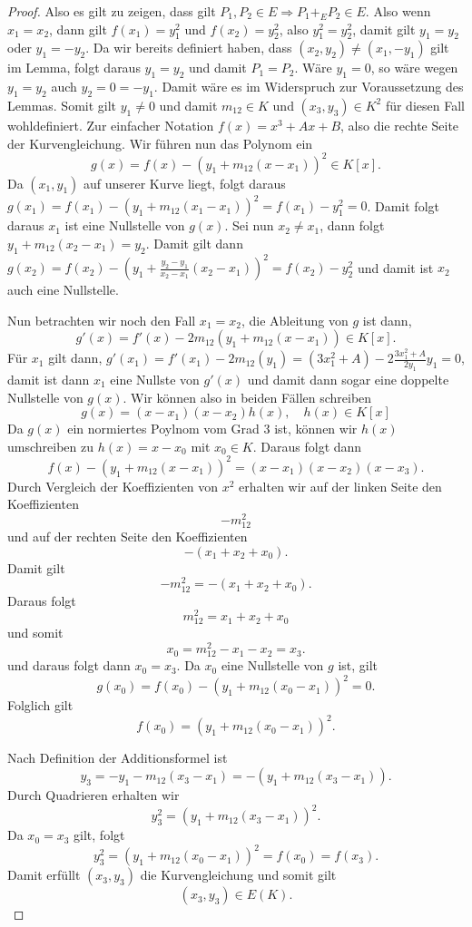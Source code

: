 \begin{proof}
    Also es gilt zu zeigen, dass gilt $P_1,P_2\in E \Rightarrow P_1 +_E P_2 \in E$. Also wenn $x_1=x_2$, dann gilt \(f(x_1)=y_1^2 \) und \(f(x_2)=y_2^2\), also $y_1^2=y_2^2$, damit gilt \(y_1= y_2 \) oder \(y_1=-y_2\). Da wir bereits definiert haben, dass $(x_2,y_2)\neq (x_1,-y_1)$ gilt im Lemma, folgt daraus $y_1=y_2$ und damit $P_1=P_2$. Wäre $y_1=0$, so wäre wegen $y_1=y_2$ auch $y_2=0=-y_1$. Damit wäre es im Widerspruch zur Voraussetzung des Lemmas. Somit gilt $y_1\neq 0$ und damit $m_{12}\in K$ und $(x_3,y_3)\in K^2$ für diesen Fall wohldefiniert.
    Zur einfacher Notation $f(x)=x^3+Ax+B$, also die rechte Seite der Kurvengleichung. Wir führen nun das Polynom ein
    \[
        g(x)=f(x)-(y_1+m_{12}(x-x_1))^2\in K[x].
    \]
    Da $(x_1,y_1)$ auf unserer Kurve liegt, folgt daraus $g(x_1)=f(x_1)-(y_1+m_{12}(x_1-x_1))^2=f(x_1)-y_1^2=0$. Damit folgt daraus $x_1$ ist eine Nullstelle von $g(x)$.
    Sei nun $x_2\neq x_1$, dann folgt $y_1+m_{12}(x_2-x_1)=y_2$. Damit gilt dann $g(x_2)=f(x_2)-(y_1+\frac{y_2-y_1}{x_2-x_1}(x_2-x_1))^2 =f(x_2)-y_2^2$ und damit ist $x_2$ auch eine Nullstelle.

    Nun betrachten wir noch den Fall $x_1=x_2$, die Ableitung von $g$ ist dann,
    \[
        g'(x)=f'(x)-2m_{12}(y_1+m_{12}(x-x_1)) \in K[x].
    \]
    Für $x_1$ gilt dann, \(g'(x_1)=f'(x_1)-2m_{12}(y_1)= (3x_1^2+A)-2\frac{3x_1^2+A}{2y_1}y_1=0 \), damit ist dann $x_1$ eine Nullste von $g'(x)$ und damit dann sogar eine doppelte Nullstelle von $g(x)$.
    Wir können also in beiden Fällen schreiben
    \[
        g(x)=(x-x_1)(x-x_2)h(x), \quad h(x)\in K[x]
    \]
    Da $g(x)$ ein normiertes Poylnom vom Grad 3 ist, können wir $h(x)$ umschreiben zu $h(x)=x-x_0$ mit $x_0\in K$. Daraus folgt dann
    \begin{equation}
        \label{eq:faktorisierung-wohldefiniertheit}
        f(x)-\left(y_1+m_{12}(x-x_1)\right)^2
        =(x-x_1)(x-x_2)(x-x_3).
    \end{equation}
    Durch Vergleich der Koeffizienten von $x^2$ erhalten wir auf der linken Seite den Koeffizienten
    \[
        -m_{12}^2
    \]
    und auf der rechten Seite den Koeffizienten
    \[
        -(x_1+x_2+x_0).
    \]
    Damit gilt
    \[
        -m_{12}^2=-(x_1+x_2+x_0).
    \]
    Daraus folgt
    \[
        m_{12}^2=x_1+x_2+x_0
    \]
    und somit
    \[
        x_0=m_{12}^2-x_1-x_2=x_3.
    \]
    und daraus folgt dann $x_0=x_3$. Da $x_0$ eine Nullstelle von $g$ ist, gilt
    \[
        g(x_0)
        =
        f(x_0)
        -
        \left(y_1+m_{12}(x_0-x_1)\right)^2
        =0.
    \]
    Folglich gilt
    \[
        f(x_0)
        =
        \left(y_1+m_{12}(x_0-x_1)\right)^2.
    \]

    Nach Definition der Additionsformel ist
    \[
        y_3
        =
        -y_1-m_{12}(x_3-x_1)
        =
        -\left(y_1+m_{12}(x_3-x_1)\right).
    \]
    Durch Quadrieren erhalten wir
    \[
        y_3^2
        =
        \left(y_1+m_{12}(x_3-x_1)\right)^2.
    \]
    Da $x_0=x_3$ gilt, folgt
    \[
        y_3^2
        =
        \left(y_1+m_{12}(x_0-x_1)\right)^2
        =
        f(x_0)
        =
        f(x_3).
    \]
    Damit erfüllt $(x_3,y_3)$ die Kurvengleichung und somit gilt
    \[
        (x_3,y_3)\in E(K).
    \]
\end{proof}
